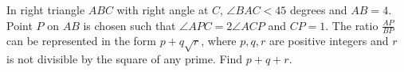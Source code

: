 In right triangle $ ABC$ with right angle at $ C$, $ \angle BAC < 45$ degrees and $ AB = 4$.  Point $ P$ on $ AB$ is chosen such that $ \angle APC = 2\angle ACP$ and $ CP = 1$.  The ratio $ \frac{AP}{BP}$ can be represented in the form $ p + q\sqrt{r}$, where $ p,q,r$ are positive integers and $ r$ is not divisible by the square of any prime.  Find $ p+q+r$.